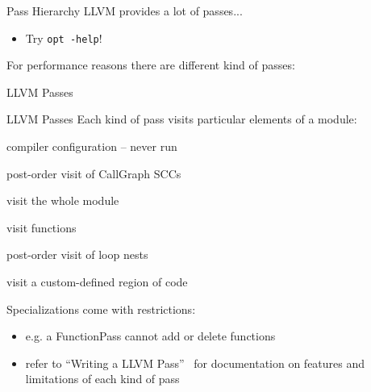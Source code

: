 \begin{frame}{Pass Hierarchy}
LLVM provides a lot of passes...

\begin{itemize}
\item Try \texttt{opt -help}!
\end{itemize}

\vfill
For performance reasons there are different kind of passes:

\begin{block}{LLVM Passes}

\centering
\end{block}
\end{frame}


\begin{frame}{LLVM Passes}
Each kind of pass visits particular elements of a module:

\begin{description}[align=left, labelwidth=1cm]
\item[ImmutablePass] compiler configuration -- never run
\item[CallGraphSCCPass] post-order visit of CallGraph SCCs
\item[ModulePass] visit the whole module
\item[FunctionPass] visit functions
\item[LoopPass] post-order visit of loop nests
\item[RegionPass] visit a custom-defined region of code
\end{description}

\vfill
Specializations come with restrictions:

\begin{itemize}
\item e.g. a \alert{FunctionPass} cannot add or delete functions
\item refer to ``Writing a LLVM Pass''~\cite{LOCAL:www/llvmWritingAPass}
      for documentation on features and limitations of each kind of pass
\end{itemize}
\end{frame}


%
%
%
%


